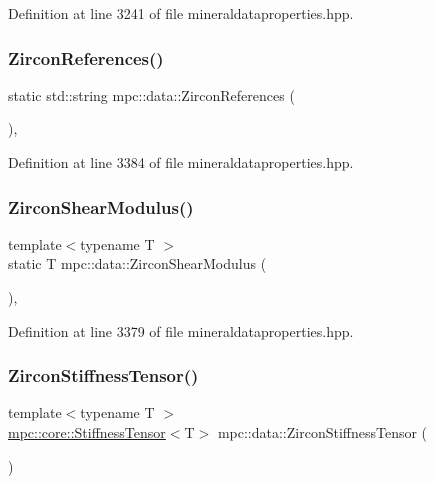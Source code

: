 Definition at line 3241 of file mineraldataproperties.\+hpp.

\mbox{\label{namespacempc_1_1data_a583bf9e1584fe880295a7f08843f4312}} 
\subsubsection{\texorpdfstring{Zircon\+References()}{ZirconReferences()}}
{\footnotesize\ttfamily static std\+::string mpc\+::data\+::\+Zircon\+References (\begin{DoxyParamCaption}{ }\end{DoxyParamCaption})\hspace{0.3cm}{\ttfamily [inline]}, {\ttfamily [static]}}



Definition at line 3384 of file mineraldataproperties.\+hpp.

\mbox{\label{namespacempc_1_1data_a5ce5d70497649c73168a4c976e81bb0c}} 
\subsubsection{\texorpdfstring{Zircon\+Shear\+Modulus()}{ZirconShearModulus()}}
{\footnotesize\ttfamily template$<$typename T $>$ \\
static T mpc\+::data\+::\+Zircon\+Shear\+Modulus (\begin{DoxyParamCaption}{ }\end{DoxyParamCaption})\hspace{0.3cm}{\ttfamily [inline]}, {\ttfamily [static]}}



Definition at line 3379 of file mineraldataproperties.\+hpp.

\mbox{\label{namespacempc_1_1data_acc622a3fec132f4b5472e2480e4d0f6d}} 
\subsubsection{\texorpdfstring{Zircon\+Stiffness\+Tensor()}{ZirconStiffnessTensor()}}
{\footnotesize\ttfamily template$<$typename T $>$ \\
\mbox{\hyperlink{structmpc_1_1core_1_1_stiffness_tensor}{mpc\+::core\+::\+Stiffness\+Tensor}}$<$T$>$ mpc\+::data\+::\+Zircon\+Stiffness\+Tensor (\begin{DoxyParamCaption}{ }\end{DoxyParamCaption})}



